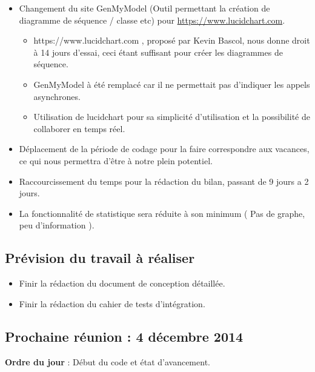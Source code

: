 \documentclass[12pt,a4paper]{article}
\begin{document}
\begin{itemize}[label = $\ast$]
	\item Changement du site GenMyModel (Outil permettant la création de diagramme de séquence / classe etc)  pour \url{https://www.lucidchart.com}.
	\begin{itemize}[label = $\circ$]
		\item https://www.lucidchart.com , proposé par Kevin Bascol, nous donne droit à 14 jours d'essai, ceci étant suffisant pour créer les diagrammes de séquence.
		\item GenMyModel à été remplacé car il ne permettait pas d'indiquer les appels asynchrones.
		\item Utilisation de lucidchart pour sa simplicité d'utilisation et la possibilité de collaborer en temps réel.
	\end{itemize}
	\item Déplacement de la période de codage pour la faire correspondre aux vacances, ce qui nous permettra d'être à notre plein potentiel.
	\item Raccourcissement du temps pour la rédaction du bilan, passant de 9 jours a 2 jours.
	\item La fonctionnalité de statistique sera réduite à son minimum ( Pas de graphe, peu d'information ).
\end{itemize}

\subsection*{Prévision du travail à réaliser}

\begin{itemize}[label = $\ast$]
	\item Finir la rédaction du document de conception détaillée.
	\item Finir la rédaction du cahier de tests d'intégration.
\end{itemize}

\subsection*{Prochaine réunion : 4 décembre 2014}

\textbf{Ordre du jour} : Début du code et état d'avancement.\\
\end{document}

